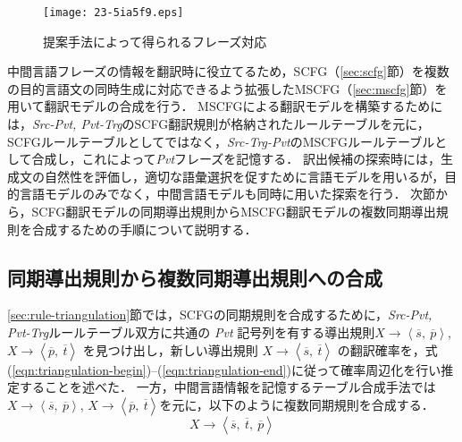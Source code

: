 \documentclass[japanese]{jnlp_1.4}
\begin{document}
\begin{figure}[b]
\begin{center}
\texttt{[image: 23-5ia5f9.eps]}
\end{center}
\caption{提案手法によって得られるフレーズ対応}
\label{fig:pivot-proposed}
\end{figure}

中間言語フレーズの情報を翻訳時に役立てるため，SCFG（\ref{sec:scfg}節）を複数の目的言語文の同時生成に対応できるよう拡張したMSCFG（\ref{sec:mscfg}節）を用いて翻訳モデルの合成を行う．
MSCFGによる翻訳モデルを構築するためには，\textit{Src-Pvt, Pvt-Trg}のSCFG翻訳規則が格納されたルールテーブルを元に，SCFGルールテーブルとしてではなく，\textit{Src-Trg-Pvt}のMSCFGルールテーブルとして合成し，これによって\textit{Pvt}フレーズを記憶する．
訳出候補の探索時には，生成文の自然性を評価し，適切な語彙選択を促すために言語モデルを用いるが，目的言語モデルのみでなく，中間言語モデルも同時に用いた探索を行う．
次節から，SCFG翻訳モデルの同期導出規則からMSCFG翻訳モデルの複数同期導出規則を合成するための手順について説明する．


\subsection{同期導出規則から複数同期導出規則への合成}

\ref{sec:rule-triangulation}節では，SCFGの同期規則を合成するために，\textit{Src-Pvt, Pvt-Trg}ルールテーブル双方に共通の \textit{Pvt} 記号列を有する導出規則$X \rightarrow \left<\overline{s},~ \overline{p}\right>$, $X \rightarrow \left<\overline{p},~ \overline{t}\right>$ を見つけ出し，新しい導出規則 $X \rightarrow \left<\overline{s},~ \overline{t}\right>$ の翻訳確率を，式(\ref{eqn:triangulation-begin})--(\ref{eqn:triangulation-end})に従って確率周辺化を行い推定することを述べた．
一方，中間言語情報を記憶するテーブル合成手法では $X \rightarrow \left<\overline{s},~ \overline{p}\right>$, $X \rightarrow \left<\overline{p},~ \overline{t}\right>$を元に，以下のように複数同期規則を合成する．
\begin{equation}
X \longrightarrow \left<\overline{s},~ \overline{t},~ \overline{p}\right>
\end{equation}
\end{document}
